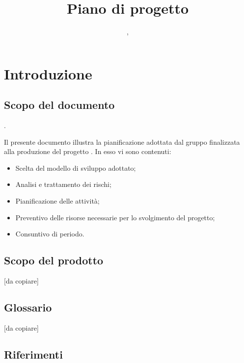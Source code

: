 

\author{\LB, \PB}
\supervisor{\GG, \MM}
\dest{\TV, \ZU}
\title{Piano di progetto}


\maketitle

\tableofcontents
\newpage

\section{Introduzione}
	\subsection{Scopo del documento}.

	Il presente documento illustra la pianificazione adottata dal gruppo \hx{} finalizzata alla produzione del progetto \proj{}. In esso vi sono contenuti:
\begin{itemize}
	\item Scelta del modello di sviluppo adottato;
	\item Analisi e trattamento dei rischi;
	\item Pianificazione delle attività;
	\item Preventivo delle risorse necessarie per lo svolgimento del progetto;
           \item Consuntivo di periodo.
\end{itemize}

	\subsection{Scopo del prodotto}
	[da copiare]
	
	\subsection{Glossario}
	[da copiare]
	\subsection{Riferimenti}
